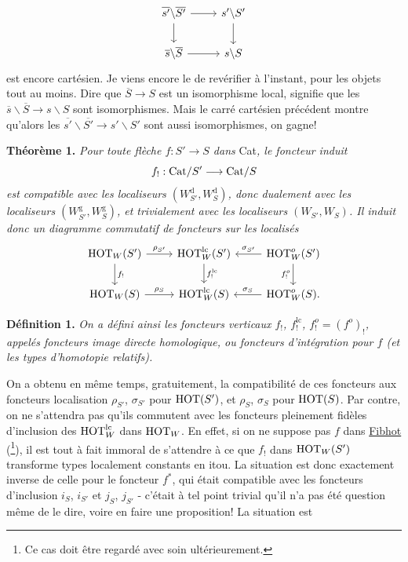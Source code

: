 \[
\begin{tikzcd}
\overline{s'}\backslash\overline{S'} \arrow[r] \arrow[d] & s'\backslash S' \arrow[d] \\
\overline{s}\backslash\overline{S} \arrow[r] & s\backslash S
\end{tikzcd}
\]
est encore
cartésien. Je viens encore le de revérifier à l'instant, pour les objets tout au moins. Dire que $\overline{S}\longrightarrow S$ est un isomorphisme local, signifie que les $\overline{s}\backslash\overline{S}\longrightarrow s\backslash S$ sont isomorphismes. Mais le carré cartésien précédent montre qu'alors les $\overline{s'}\backslash\overline{S'}\longrightarrow s'\backslash S'$ sont aussi isomorphismes, on gagne! %

\textbf{Théorème 1.} \textit{Pour toute flèche $f:S'\longrightarrow S$ dans} Cat\textit{, le foncteur induit}
\[ f_! : \mathrm{Cat}/S' \longrightarrow \mathrm{Cat}/S \]
\textit{est compatible avec les localiseurs $(W_{S'}^{\mathrm{d}},W_S^{\mathrm{d}})$, donc dualement avec les localiseurs $(W_{S'}^{\mathrm{g}},W_S^{\mathrm{g}})$, et trivialement avec les localiseurs $(W_{S'},W_S)$. Il induit donc un diagramme commutatif de foncteurs sur les localisés}
\[
\begin{tikzcd}
\HOT_W(S') \arrow[r, "\rho_{S'}"] \arrow[d, "f_!"] & \HOT_W^{\mathrm{lc}}(S') \arrow[d, "f_!^{\mathrm{lc}}"] & \HOT_W^o(S') \arrow[l, "\sigma_{S'}"'] \arrow[d, "f_!^o"'] \\
\HOT_W(S) \arrow[r, "\rho_S"] & \HOT_W^{\mathrm{lc}}(S) & \HOT_W^o(S). \arrow[l, "\sigma_S"']
\end{tikzcd}
\]

\textbf{Définition 1.} \textit{On a défini ainsi les foncteurs verticaux $f_!$, $f_!^{\mathrm{lc}}$, $f_!^o=(f^o)_!$, appelés foncteurs image directe homologique, ou foncteurs d'intégration pour $f$ (et les types d'homotopie relatifs).}

On a obtenu en même temps, gratuitement, la compatibilité de ces foncteurs aux foncteurs localisation $\rho_{S'}$, $\sigma_{S'}$ pour $\mathrm{HOT}(S')$, et $\rho_S$, $\sigma_S$ pour $\mathrm{HOT}(S)$. Par contre, on ne s'attendra pas qu'ils commutent avec les foncteurs pleinement fidèles d'inclusion des $\mathrm{HOT}_W^{\mathrm{lc}}$ dans $\mathrm{HOT}_W$. En effet, si on ne suppose pas $f$ dans \underline{Fibhot} (\footnote[67]{Ce cas doit être regardé avec soin ultérieurement.}), il est tout à fait immoral de s'attendre à ce que $f_!$ dans $\mathrm{HOT}_W(S')$ transforme types localement constants en itou. La situation est donc exactement inverse de celle pour le foncteur $f^*$, qui était compatible avec les foncteurs d'inclusion $i_S$, $i_{S'}$ et $j_S$, $j_{S'}$ - c'était à tel point trivial qu'il n'a pas été question même de le dire, voire en faire une proposition! La situation est

